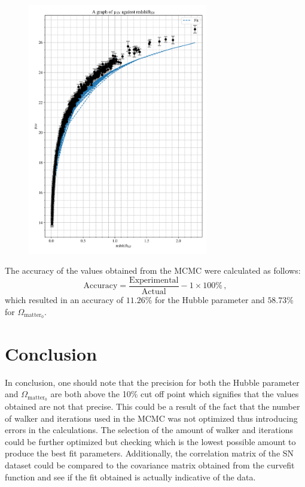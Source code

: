 \documentclass[12pt, a4paper]{article}
\begin{document}
\begin{figure}[H]
    \centering
    \includegraphics[width = 0.7\textwidth]{Graph 5.png}
    \label{fig:final~graph}
\end{figure}

The accuracy of the values obtained from the MCMC were calculated as follows:
\begin{equation}
    \mathrm{Accuracy} = \frac{\mathrm{Experimental}}{\mathrm{Actual}} - 1 \times 100\% \,,
\end{equation}
which resulted in an accuracy of \(11.26\%\) for the Hubble parameter and \(58.73\%\) for \(\Omega_{\mathrm{matter_0}}\).

\section{Conclusion}

In conclusion, one should note that the precision for both the Hubble parameter and \(\Omega_{\mathrm{matter_0}}\) are both above the 10\% cut off point which signifies that the values obtained are not that precise. This could be a result of the fact that the number of walker and iterations used in the MCMC was not optimized thus introducing errors in the calculations. The selection of the amount of walker and iterations could be further optimized but checking which is the lowest possible amount to produce the best fit parameters. Additionally, the correlation matrix of the SN dataset could be compared to the covariance matrix obtained from the curvefit function and see if the fit obtained is actually indicative of the data.
\end{document}
